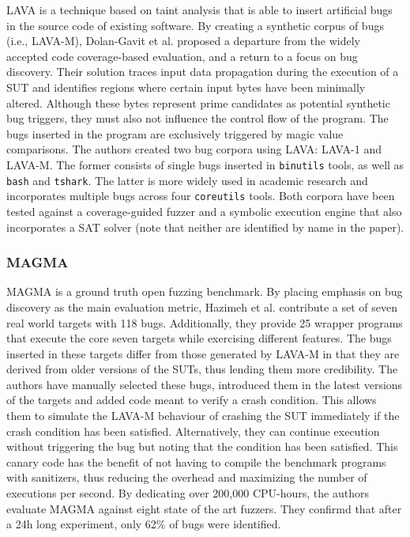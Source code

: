 LAVA \cite{dolan2016lava} is a technique based on taint analysis that is able to insert artificial bugs in the source code of existing software. By creating a synthetic corpus of bugs (i.e., LAVA-M), Dolan-Gavit et al. proposed a departure from the widely accepted code coverage-based evaluation, and a return to a focus on bug discovery. Their solution traces input data propagation during the execution of a SUT and identifies regions where certain input bytes have been minimally altered. Although these bytes represent prime candidates as potential synthetic bug triggers, they must also not influence the control flow of the program. The bugs inserted in the program are exclusively triggered by magic value comparisons. The authors created two bug corpora using LAVA: LAVA-1 and LAVA-M. The former consists of single bugs inserted in \texttt{binutils} tools, as well as \texttt{bash} and \texttt{tshark}. The latter is more widely used in academic research and incorporates multiple bugs across four \texttt{coreutils} tools. Both corpora have been tested against a coverage-guided fuzzer and a symbolic execution engine that also incorporates a SAT solver (note that neither are identified by name in the paper).

\subsubsection{MAGMA}
\label{extend:netfuzz:benchmarks:magma}

MAGMA \cite{hazimeh2020magma} is a ground truth open fuzzing benchmark. By placing emphasis on bug discovery as the main evaluation metric, Hazimeh et al. contribute a set of seven real world targets with 118 bugs. Additionally, they provide 25 wrapper programs that execute the core seven targets while exercising different features. The bugs inserted in these targets differ from those generated by LAVA-M in that they are derived from older versions of the SUTs, thus lending them more credibility. The authors have manually selected these bugs, introduced them in the latest versions of the targets and added code meant to verify a crash condition. This allows them to simulate the LAVA-M behaviour of crashing the SUT immediately if the crash condition has been satisfied. Alternatively, they can continue execution without triggering the bug but noting that the condition has been satisfied. This canary code has the benefit of not having to compile the benchmark programs with sanitizers, thus reducing the overhead and maximizing the number of executions per second. By dedicating over 200,000 CPU-hours, the authors evaluate MAGMA against eight state of the art fuzzers. They confirmd that after a 24h long experiment, only 62\% of bugs were identified.

